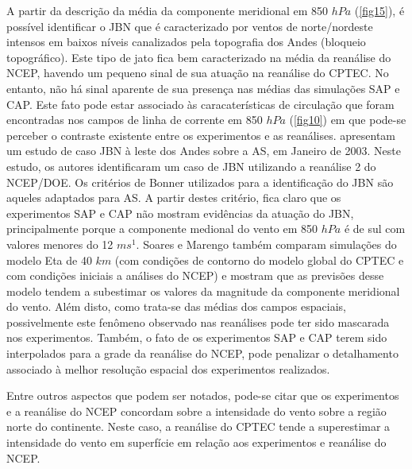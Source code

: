 A partir da descrição da média da componente meridional em 850 $hPa$ (\autoref{fig15}), é possível identificar o JBN que é caracterizado por ventos de norte/nordeste intensos em baixos níveis canalizados pela topografia dos Andes (bloqueio topográfico). Este tipo de jato fica bem caracterizado na média da reanálise do NCEP, havendo um pequeno sinal de sua atuação na reanálise do CPTEC. No entanto, não há sinal aparente de sua presença nas médias das simulações SAP e CAP. Este fato pode estar associado às caracaterísticas de circulação que foram encontradas nos campos de linha de corrente em 850 $hPa$ (\autoref{fig10}) em que pode-se perceber o contraste existente entre os experimentos e as reanálises.  apresentam um estudo de caso JBN à leste dos Andes sobre a AS, em Janeiro de 2003. Neste estudo, os autores identificaram um caso de JBN utilizando a reanálise 2 do NCEP/DOE. Os critérios de Bonner utilizados para a identificação do JBN são aqueles adaptados para AS. A partir destes critério, fica claro que os experimentos SAP e CAP não mostram evidências da atuação do JBN, principalmente porque a componente medional do vento em 850 $hPa$ é de sul com valores menores do 12 $ms^{1}$. Soares e Marengo também comparam simulações do modelo Eta de 40 $km$ (com condições de contorno do modelo global do CPTEC e com condições iniciais a análises do NCEP) e mostram que as previsões desse modelo tendem a subestimar os valores da magnitude da componente meridional do vento. Além disto, como trata-se das médias dos campos espaciais, possivelmente este fenômeno observado nas reanálises pode ter sido mascarada nos experimentos. Também, o fato de os experimentos SAP e CAP terem sido interpolados para a grade da reanálise do NCEP, pode penalizar o detalhamento associado à melhor resolução espacial dos experimentos realizados.

Entre outros aspectos que podem ser notados, pode-se citar que os experimentos e a reanálise do NCEP concordam sobre a intensidade do vento sobre a região norte do continente. Neste caso, a reanálise do CPTEC tende a superestimar a intensidade do vento em superfície em relação aos experimentos e reanálise do NCEP. 


